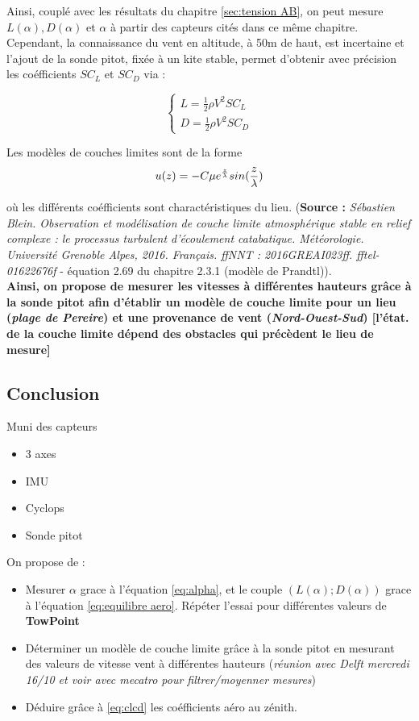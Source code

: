\documentclass[conference]{IEEEtran}
\begin{document}
Ainsi, couplé avec les résultats du chapitre \ref{sec:tension AB}, on peut mesure $L(\alpha), D(\alpha)$ et $\alpha$ à partir des capteurs cités dans ce même chapitre. 
Cependant, la connaissance du vent en altitude, à 50m de haut, est incertaine et l'ajout de la sonde pitot, fixée à un kite stable, permet d'obtenir avec précision les coéfficients $SC_L$ et $SC_D$ via :

\begin{equation}
    \begin{cases}
        L = \frac{1}{2} \rho V^2 SC_L \\
        D = \frac{1}{2} \rho V^2 SC_D 
    \end{cases}
    \label{eq:clcd}
\end{equation}

Les modèles de couches limites sont de la forme 
\begin{equation}
        u(z) = -C \mu e^{\frac{z}{\lambda}} sin(\frac{z}{\lambda}) \\
\end{equation}

où les différents coéfficients sont charactéristiques du lieu. (\textbf{Source :} \textit{Sébastien Blein. Observation et modélisation de couche limite atmosphérique stable en relief complexe : le processus turbulent d’écoulement catabatique. Météorologie. Université Grenoble Alpes, 2016. Français. ffNNT : 2016GREAI023ff. fftel-01622676f} - équation 2.69 du chapitre 2.3.1 (modèle de Prandtl)). \\

\textbf{Ainsi, on propose de mesurer les vitesses à différentes hauteurs grâce à la sonde pitot afin d'établir un modèle de couche limite pour un lieu (\textit{plage de Pereire}) et une provenance de vent (\textit{Nord-Ouest-Sud}) [l'état. de la couche limite dépend des obstacles qui précèdent le lieu de mesure]}

\subsection{Conclusion }

Muni des capteurs
\begin{itemize}
    \item 3 axes
    \item IMU
    \item Cyclops
    \item Sonde pitot\\
\end{itemize} 

On propose de :
\begin{itemize}
    \item Mesurer $\alpha$ grace à l'équation \ref{eq:alpha}, et le couple $(L(\alpha);D(\alpha))$ grace à l'équation \ref{eq:equilibre aero}. Répéter l'essai pour différentes valeurs de \textbf{TowPoint}
    \item Déterminer un modèle de couche limite grâce à la sonde pitot en mesurant des valeurs de vitesse vent à différentes hauteurs (\textit{réunion avec Delft mercredi 16/10 et voir avec mecatro pour filtrer/moyenner mesures})
    \item Déduire grâce à \ref{eq:clcd} les coéfficients aéro au zénith.
\end{itemize} 
\end{document}
